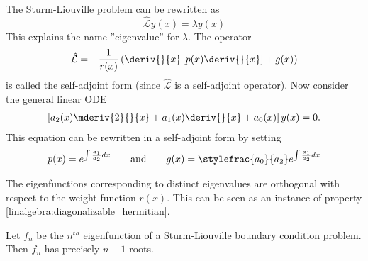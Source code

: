 	\begin{definition}
		The Sturm-Liouville problem can be rewritten as \[\hat{\mathcal{L}}y(x) = \lambda y(x)\] This explains the name ''eigenvalue'' for $\lambda$. The operator
		\begin{gather}
			\hat{\mathcal{L}} = -\frac{1}{r(x)}\left(\deriv{}{x}\left[p(x)\deriv{}{x}\right] + g(x)\right)
		\end{gather}
		is called the self-adjoint form (since $\hat{\mathcal{L}}$ is a self-adjoint operator). Now consider the general linear ODE
		\begin{gather}
			\left[a_2(x)\mderiv{2}{}{x} + a_1(x)\deriv{}{x} + a_0(x)\right]y(x) = 0.
		\end{gather}
		This equation can be rewritten in a self-adjoint form by setting
		\begin{gather}
			p(x) = e^{\int\frac{a_1}{a_2}dx}\qquad\text{and}\qquad g(x) = \stylefrac{a_0}{a_2}e^{\int\frac{a_1}{a_2}dx}
		\end{gather}
	\end{definition}
    
	\begin{property}
		The eigenfunctions corresponding to distinct eigenvalues are orthogonal with respect to the weight function $r(x)$. This can be seen as an instance of property \ref{linalgebra:diagonalizable_hermitian}.
	\end{property}

	\begin{theorem}
		Let $f_n$ be the $n^{th}$ eigenfunction of a Sturm-Liouville boundary condition problem. Then $f_n$ has precisely $n-1$ roots.
	\end{theorem}